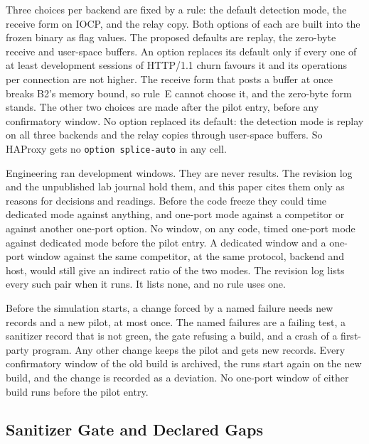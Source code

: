  Three choices per backend are fixed by a rule: the default detection mode, the
receive form on IOCP, and the relay copy. Both options of each are built into the frozen binary as
flag values. The proposed defaults are replay, the zero-byte receive and user-space buffers. An
option replaces its default only if every one of at least \RuleESessions{} development sessions of
HTTP/1.1 churn favours it and its operations per connection are not higher. The receive form that posts a buffer
at once breaks B2's memory bound, so rule~E cannot choose it, and the zero-byte form stands. The
other two choices are made after the pilot entry, before any confirmatory window. No option
replaced its default: the detection mode is replay on all three backends and the relay copies
through user-space buffers. So HAProxy gets no \texttt{option splice-auto} in any cell.

 Engineering ran development windows. They are never results. The revision
log and the unpublished lab journal hold them, and this paper cites them only as reasons for
decisions and readings. Before the code freeze they
could time dedicated mode against anything, and one-port mode against a competitor or against
another one-port option. No window, on any code, timed one-port mode against dedicated mode before
the pilot entry. A dedicated window and a one-port window against the same competitor, at the same
protocol, backend and host, would still give an indirect ratio of the two modes. The revision log
lists every such pair when it runs. It lists none, and no rule uses one.

 Before the simulation starts, a change forced by a
named failure needs new records and a new pilot, at most once. The named failures are a failing
test, a sanitizer record that is not green, the gate refusing a build, and a crash of a
first-party program. Any other change keeps the pilot and gets new records. Every confirmatory
window of the old build is archived, the runs start again on the new build, and the change is
recorded as a deviation. No one-port window of either build
runs before the pilot entry.

\subsection{Sanitizer Gate and Declared Gaps}\label{sec:gate}

